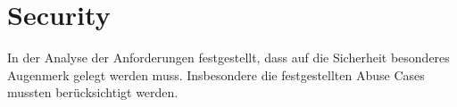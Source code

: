 \section{Security}


In der Analyse der Anforderungen festgestellt, dass auf die Sicherheit besonderes Augenmerk gelegt werden muss. Insbesondere die festgestellten Abuse Cases mussten berücksichtigt werden.

